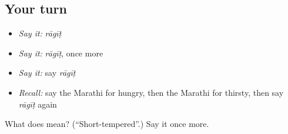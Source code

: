 \subsection*{Your turn}
\begin{itemize}
\raggedright
  \item \emph{Say it:} \emph{rāgīṭ}
  \item \emph{Say it:} \emph{rāgīṭ}, once more
  \item \emph{Say it:} say \emph{rāgīṭ}
  \item \emph{Recall:} say the Marathi for hungry, then the Marathi for thirsty, then say \emph{rāgīṭ} again
\end{itemize}

\begin{tcolorbox}[breakable,colback=teal!4,colframe=teal!35!black,title={Before you move on}]
What does  mean? (\textquotedblleft{}Short-tempered\textquotedblright{}.) Say it once more.
\end{tcolorbox}
